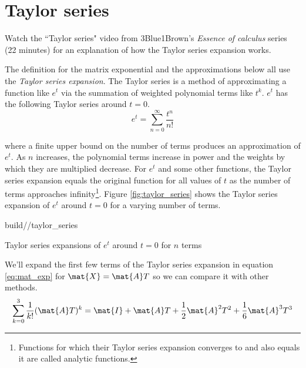 \section{Taylor series}
\begin{remark}
  Watch the ``Taylor series" video from 3Blue1Brown's \textit{Essence of
  calculus} series (22 minutes) \cite{bib:calculus_taylor_series} for an
  explanation of how the Taylor series expansion works.
\end{remark}

The definition for the matrix exponential and the approximations below all use
the \textit{Taylor series expansion}. The Taylor series is a method of
approximating a function like $e^t$ via the summation of weighted polynomial
terms like $t^k$. $e^t$ has the following Taylor series around $t = 0$.
\begin{equation*}
  e^t = \sum_{n = 0}^\infty \frac{t^n}{n!}
\end{equation*}

where a finite upper bound on the number of terms produces an approximation of
$e^t$. As $n$ increases, the polynomial terms increase in power and the weights
by which they are multiplied decrease. For $e^t$ and some other functions, the
Taylor series expansion equals the original function for all values of $t$ as
the number of terms approaches infinity\footnote{Functions for which their
Taylor series expansion converges to and also equals it are called analytic
functions.}. Figure \ref{fig:taylor_series} shows the Taylor series expansion of
$e^t$ around $t = 0$ for a varying number of terms.
\begin{svg}{build/\chapterpath/taylor_series}
  \caption{Taylor series expansions of $e^t$ around $t = 0$ for $n$ terms}
  \label{fig:taylor_series}
\end{svg}

We'll expand the first few terms of the Taylor series expansion in equation
\eqref{eq:mat_exp} for $\mat{X} = \mat{A}T$ so we can compare it with other
methods.
\begin{equation*}
  \sum_{k=0}^3 \frac{1}{k!} (\mat{A}T)^k = \mat{I} + \mat{A}T +
    \frac{1}{2}\mat{A}^2T^2 + \frac{1}{6}\mat{A}^3T^3
\end{equation*}

